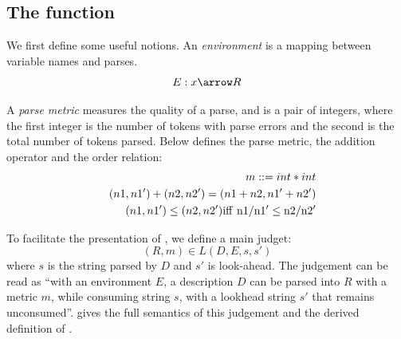 \subsection{The  function}
\label{sec:parse}
We first define some useful notions.
An {\em environment} is a mapping between variable names and parses.
\[E : x \arrow R \]

A {\em parse metric} measures the quality of a parse, and is a 
pair of integers, where the first integer is the number of tokens
with parse errors and the second is the total number of tokens parsed.
Below defines the parse metric, the addition operator and the order
relation:
\begin{eqnarray*}
&&m ::= int * int \\        
&&(n1, n1') + (n2, n2') = (n1 + n2, n1' + n2')  \\ 
&&(n1,n1') \le (n2,n2') \rm{iff}~ n1/n1' \le n2/n2' 
\end{eqnarray*}

To facilitate the presentation of , we define a main
judget:
\[(R, m) \in L(D, E, s, s')\]
where $s$ is the string parsed by $D$ and $s'$ is look-ahead.
The judgement can be read as ``with an environment $E$, a description $D$
can be parsed into $R$ with a metric $m$, while consuming
string $s$, with a lookhead string $s'$ that remains unconsumed''.
 gives the full semantics of this judgement and
the derived definition of .


